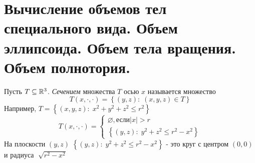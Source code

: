 \documentclass[../main.tex]{subfiles}
\begin{document}
\newpage
\hypertarget{q16}{\section{Вычисление объемов тел специального вида. Объем эллипсоида. Объем тела вращения. Объем полнотория.}}
Пусть \( T \subseteq   \mathbb{R} ^3\). \emph{Сечением} множества \( T\) осью \( x\) называется множество 
\[ T\left( x, \cdot, \cdot\right)=\left\{ \left( y,z\right):\; \left( x,y,z\right) \in T\right\}\]
Например, \( T=\left\{ \left( x,y,z\right):\;x^2+y^2+z^2 \leq r^2\right\}\)
\begin{equation*}
    T\left( x,\cdot,\cdot\right)=
    \begin{cases}
        \varnothing ,\text{если} \left| x\right|>r\\
        \left\{ \left( y,z\right):\;y^2+z^2 \leq r^2-x^2\right\}
    \end{cases}    
\end{equation*}
На плоскости \( \left( y,z\right)\)   \( \left\{ \left( y,z\right):\;y^2+z^2 \leq r^2-x^2\right\}\) - это круг с центром \( \left( 0,0\right)\) и радиуса \( \sqrt[]{r^2-x^2}\)
\end{document}
